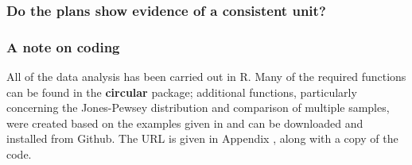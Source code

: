 \documentclass[../../ArchStats.tex]{subfiles}
\begin{document}

\subsubsection{Do the plans show evidence of a consistent unit?}



\subsubsection{A note on coding}
All of the data analysis has been carried out in R. Many of the required functions can be found in the \textbf{circular} package; additional functions, particularly concerning the Jones-Pewsey distribution and comparison of multiple samples, were created based on the examples given in \cite{Pewsey2014} and can be downloaded and installed from Github. The URL is given in Appendix , along with a copy of the code.
\end{document}
